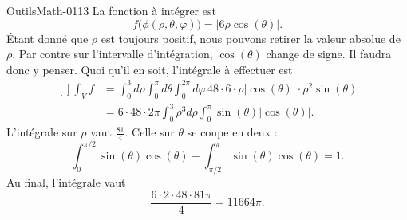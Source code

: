 \begin{corrige}{OutilsMath-0113}
    La fonction à intégrer est 
    \begin{equation}
        f\big( \phi(\rho,\theta,\varphi) \big)=|6\rho\cos(\theta)|.
    \end{equation}
    Étant donné que $\rho$ est toujours positif, nous pouvons retirer la valeur absolue de $\rho$. Par contre sur l'intervalle d'intégration, $\cos(\theta)$ change de signe. Il faudra donc y penser. Quoi qu'il en soit, l'intégrale à effectuer est
    \begin{equation}
        \begin{aligned}[]
            \int_Vf&=\int_0^3d\rho\int_0^{\pi}d\theta\int_0^{2\pi}d\varphi\,48\cdot 6\cdot  \rho| \cos(\theta) |\cdot \rho^2\sin(\theta)\\
            &=6\cdot 48\cdot 2\pi\int_0^3\rho^3d\rho\int_0^{\pi}\sin(\theta)| \cos(\theta) |.
        \end{aligned}
    \end{equation}
    L'intégrale sur $\rho$ vaut $\frac{ 81 }{ 4 }$. Celle sur $\theta$ se coupe en deux :
    \begin{equation}
        \int_0^{\pi/2}\sin(\theta)\cos(\theta)-\int_{\pi/2}^{\pi}\sin(\theta)\cos(\theta)=1.
    \end{equation}
    Au final, l'intégrale vaut
    \begin{equation}
        \frac{ 6\cdot 2\cdot 48\cdot 81\pi }{ 4 }=11664\pi.
    \end{equation}
        
\end{corrige}
